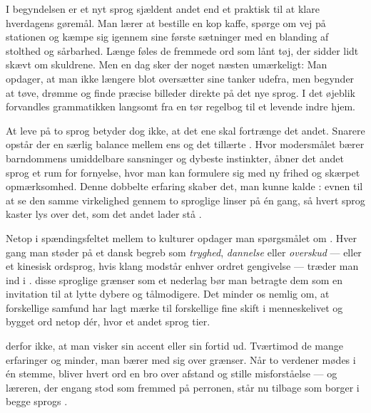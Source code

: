 I begyndelsen er et nyt sprog sjældent andet end et praktisk  til at klare hverdagens gøremål. Man lærer at bestille en kop kaffe, spørge om vej på stationen og kæmpe sig igennem sine første  sætninger med en blanding af stolthed og sårbarhed. Længe føles de fremmede ord som lånt tøj, der sidder lidt skævt om skuldrene. Men en dag sker der noget næsten umærkeligt: Man opdager, at man ikke længere blot oversætter sine tanker udefra, men begynder at tøve, drømme og finde præcise billeder direkte på det nye sprog. I det øjeblik forvandles grammatikken langsomt fra en tør regelbog til et levende indre hjem.

At leve på to sprog betyder dog ikke, at det ene skal fortrænge det andet. Snarere opstår der en særlig balance mellem ens  og det tillærte . Hvor modersmålet bærer barndommens umiddelbare sansninger og dybeste instinkter, åbner det andet sprog et rum for fornyelse, hvor man kan formulere sig med ny frihed og skærpet opmærksomhed. Denne dobbelte erfaring skaber det, man kunne kalde : evnen til at se den samme virkelighed gennem to sproglige linser på én gang, så hvert sprog kaster lys over det, som det andet lader stå .

Netop i spændingsfeltet mellem to kulturer opdager man spørgsmålet om . Hver gang man støder på et dansk begreb som \textit{tryghed}, \textit{dannelse} eller \textit{overskud} --- eller et kinesisk ordsprog, hvis klang modstår enhver ordret gengivelse --- træder man ind i .  disse sproglige grænser som et nederlag bør man betragte dem som en invitation til at lytte dybere og tålmodigere. Det  minder os nemlig om, at forskellige samfund har lagt mærke til forskellige fine skift i menneskelivet og bygget ord netop dér, hvor et andet sprog tier.

 derfor ikke, at man visker sin accent eller sin fortid ud. Tværtimod  de mange erfaringer og minder, man bærer med sig over grænser. Når to verdener mødes i én stemme, bliver hvert ord en bro over afstand og stille misforståelse --- og læreren, der engang stod som fremmed på perronen, står nu tilbage som borger i begge sprogs .

